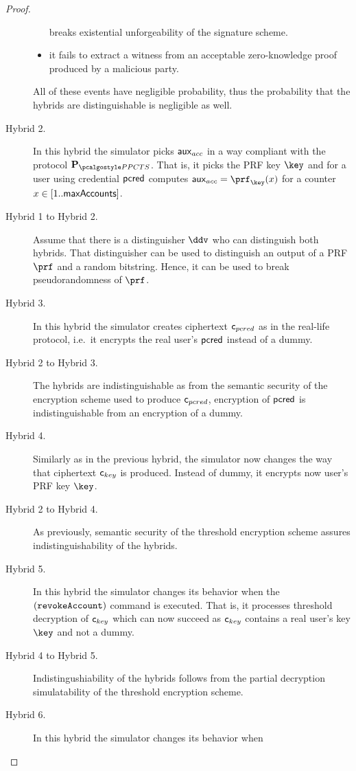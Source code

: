 \documentclass[runningheads,10pt]{llncs}
\numberwithin{equation}{section}
\begin{document}
\begin{proof}
\begin{description}
\begin{itemize}
      breaks existential unforgeability of the signature scheme.
    \item it fails to extract a witness from an acceptable zero-knowledge proof
      produced by a malicious party.
    \end{itemize}
    All of these events have negligible probability, thus the probability that
    the hybrids are distinguishable is negligible as well.
  \item[Hybrid 2.] In this hybrid the simulator picks $\mathsf{aux}_{acc}$ in a way
    compliant with the protocol $\prot{\PPCTS}$. That is, it picks the PRF key
    $\key$ and for a user using credential $\mathsf{pcred}$ computes $\aux_{acc} =
    \prf_\key(x)$ for a counter $x \in [1 .. \mathsf{maxAccounts}]$.
  \item[Hybrid 1 to Hybrid 2.] Assume that there is a distinguisher $\ddv$ who
    can distinguish both hybrids. That distinguisher can be used to distinguish
    an output of a PRF $\prf$ and a random bitstring. Hence, it can be used to
    break pseudorandomness of $\prf$.
  \item[Hybrid 3.] In this hybrid the simulator creates ciphertext $\mathsf{c}_{pcred}$ as
    in the real-life protocol, i.e.~it encrypts the real user's $\mathsf{pcred}$
    instead of a dummy.
  \item[{Hybrid 2 to Hybrid 3.}] The hybrids are indistinguishable as from the
    semantic security of the encryption scheme used to produce $\mathsf{c}_{pcred}$,
    encryption of $\mathsf{pcred}$ is indistinguishable from an encryption of a dummy.
  \item[{Hybrid 4.}] Similarly as in the previous hybrid, the simulator now
    changes the way that ciphertext $\mathsf{c}_{key}$ is produced. Instead of dummy, it
    encrypts now user's PRF key $\key$.
  \item[{Hybrid 2 to Hybrid 4.}] As previously, semantic security of the
    threshold encryption scheme assures indistinguishability of the hybrids.
  \item[{Hybrid 5.}] In this hybrid the simulator changes its behavior when the
    $(\mathtt{revokeAccount})$ command is executed. That is, it processes threshold
    decryption of $\mathsf{c}_{key}$ which can now succeed as $\mathsf{c}_{key}$ contains a real
    user's key $\key$ and not a dummy.
  \item[{Hybrid 4 to Hybrid 5.}] Indistingushiability of the hybrids follows
    from the partial decryption simulatability of the threshold encryption
    scheme.
  \item[{Hybrid 6.}] In this hybrid the simulator changes its behavior when

\end{description}
\end{proof}
\end{document}
